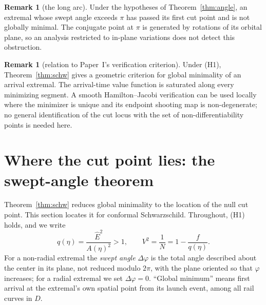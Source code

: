 \documentclass[aip,jmp,amsmath,amssymb,reprint]{revtex4-2}
\newcommand{\Ehat}{\hat E}
\theoremstyle{plain}
\theoremstyle{definition}
\newtheorem{remark}[proposition]{Remark}
\begin{document}
\begin{remark}[the long arc]\label{rmk:long-arc}
Under the hypotheses of Theorem~\ref{thm:angle}, an extremal whose
swept angle exceeds $\pi$ has passed its first cut point and is not
globally minimal. The conjugate point at $\pi$ is generated by
rotations of its orbital plane, so an analysis restricted to
in-plane variations does not detect this obstruction.
\end{remark}

\begin{remark}[relation to Paper~I's verification criterion]
Under (H1), Theorem~\ref{thm:schw} gives a geometric criterion for
global minimality of an arrival extremal. The arrival-time value
function is saturated along every minimizing segment. A smooth
Hamilton--Jacobi verification can be used locally where the
minimizer is unique and its endpoint shooting map is non-degenerate;
no general identification of the cut locus with the set of
non-differentiability points is needed here.
\end{remark}

\section{Where the cut point lies: the swept-angle theorem}
\label{sec:angle}
Theorem~\ref{thm:schw} reduces global minimality to the location of the null cut
point. This section locates it for conformal Schwarzschild. Throughout, (H1) holds, and
we write
\begin{equation}
  q(\eta)=\frac{\Ehat^2}{A(\eta)^2}>1,\qquad V^2=\frac1N=1-\frac{f}{q(\eta)} .
  \label{eq:q}
\end{equation}
For a non-radial extremal the \emph{swept angle} $\Delta\varphi$ is the total angle
described about the center in its plane, not reduced modulo $2\pi$, with the plane
oriented so that $\varphi$ increases; for a radial extremal we set $\Delta\varphi=0$.
``Global minimum'' means first arrival at the extremal's own spatial point from its
launch event, among all rail curves in $D$.
\end{document}
